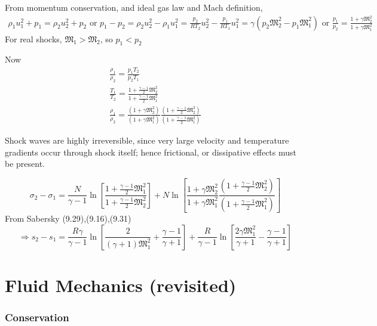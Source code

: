 \documentclass[twoside,landscape,10pt]{amsart}
\theoremstyle{plain}
\theoremstyle{definition}
\theoremstyle{remark}
\theoremstyle{remark}
\begin{document}
\begin{multicols*}{2}
From momentum conservation, and ideal gas law and Mach definition,
\[
\begin{gathered}
  \rho_1 u_1^2 + p_1 = \rho_2 u_2^2 + p_2 \text{ or } p_1 - p_2 = \rho_2u_2^2 - \rho_1u_1^2 = \frac{p_2}{RT_2} u_2^2 - \frac{p_1}{RT_1} u_1^2 = \gamma \left( p_2 \mathfrak{M}_2^2 - p_1\mathfrak{M}_1^2 \right) \text{ or } \frac{p_1}{p_2} = \frac{1+\gamma \mathfrak{M}_2^2}{ 1 + \gamma \mathfrak{M}_1^2 }
\end{gathered}
\]
For real shocks, $\mathfrak{M}_1 > \mathfrak{M}_2$, so $p_1 < p_2$

Now
\[
\begin{gathered}
  \frac{\rho_1}{\rho_2} = \frac{p_1T_2}{p_2T_1} \\ 
  \frac{T_1}{T_2} = \frac{ 1 + \frac{\gamma-1}{2} \mathfrak{M}_2^2 }{ 1 + \frac{\gamma-1}{2} \mathfrak{M}_1^2 } \\
  \frac{\rho_1}{\rho_2} = \frac{(1+\gamma \mathfrak{M}_2^2 )}{ (1 + \gamma \mathfrak{M}_1^2 ) } \frac{ (1 + \frac{\gamma -1}{2} \mathfrak{M}_2^2 ) }{ (1 + \frac{\gamma-1}{2} \mathfrak{M}_1^2)}
\end{gathered}
\]


Shock waves are highly irreversible, since very large velocity and temperature gradients occur through shock itself; hence frictional, or dissipative effects must be present.\cite{SAHG1998}


\[
\sigma_2 - \sigma_1 = \frac{N}{\gamma -1} \ln{ \left[ \frac{1 + \frac{\gamma -1}{2} \mathfrak{M}_1^2 }{ 1 + \frac{\gamma-1}{2} \mathfrak{M}_2^2 } \right] } + N \ln{ \left[ \frac{1 + \gamma \mathfrak{M}_2^2 }{ 1 + \gamma \mathfrak{M}_1^2 } \frac{ ( 1 + \frac{\gamma -1}{2} \mathfrak{M}_2^2 ) }{ (1 + \frac{\gamma-1}{2} \mathfrak{M}_1^2) } \right] }
\]
From Sabersky (9.29),(9.16),(9.31) \cite{SAHG1998}
\[
\Longrightarrow s_2 - s_1 = \frac{R\gamma}{\gamma -1} \ln{ \left[ \frac{2}{(\gamma +1) \mathfrak{M}_1^2} + \frac{\gamma -1}{\gamma +1} \right] } + \frac{R}{\gamma -1} \ln{ \left[ \frac{2\gamma \mathfrak{M}_1^2 }{ \gamma +1 } - \frac{\gamma -1}{\gamma +1 } \right] }
\]



\part{Fluid Mechanics (revisited)}

\section{Conservation}


\end{multicols*}
\end{document}
